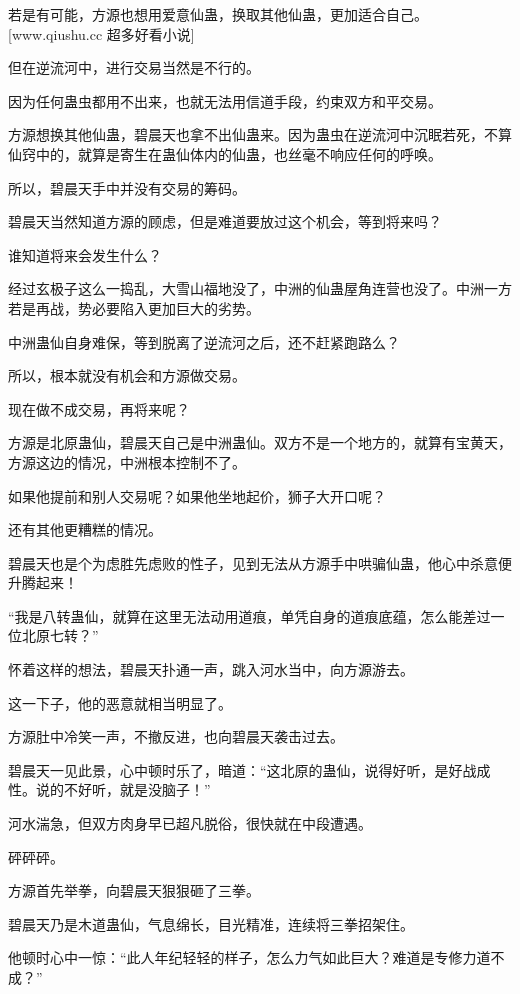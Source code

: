 
\begin{this_body}

若是有可能，方源也想用爱意仙蛊，换取其他仙蛊，更加适合自己。[www.qiushu.cc 超多好看小说]

但在逆流河中，进行交易当然是不行的。

因为任何蛊虫都用不出来，也就无法用信道手段，约束双方和平交易。

方源想换其他仙蛊，碧晨天也拿不出仙蛊来。因为蛊虫在逆流河中沉眠若死，不算仙窍中的，就算是寄生在蛊仙体内的仙蛊，也丝毫不响应任何的呼唤。

所以，碧晨天手中并没有交易的筹码。

碧晨天当然知道方源的顾虑，但是难道要放过这个机会，等到将来吗？

谁知道将来会发生什么？

经过玄极子这么一捣乱，大雪山福地没了，中洲的仙蛊屋角连营也没了。中洲一方若是再战，势必要陷入更加巨大的劣势。

中洲蛊仙自身难保，等到脱离了逆流河之后，还不赶紧跑路么？

所以，根本就没有机会和方源做交易。

现在做不成交易，再将来呢？

方源是北原蛊仙，碧晨天自己是中洲蛊仙。双方不是一个地方的，就算有宝黄天，方源这边的情况，中洲根本控制不了。

如果他提前和别人交易呢？如果他坐地起价，狮子大开口呢？

还有其他更糟糕的情况。

碧晨天也是个为虑胜先虑败的性子，见到无法从方源手中哄骗仙蛊，他心中杀意便升腾起来！

“我是八转蛊仙，就算在这里无法动用道痕，单凭自身的道痕底蕴，怎么能差过一位北原七转？”

怀着这样的想法，碧晨天扑通一声，跳入河水当中，向方源游去。

这一下子，他的恶意就相当明显了。

方源肚中冷笑一声，不撤反进，也向碧晨天袭击过去。

碧晨天一见此景，心中顿时乐了，暗道：“这北原的蛊仙，说得好听，是好战成性。说的不好听，就是没脑子！”

河水湍急，但双方肉身早已超凡脱俗，很快就在中段遭遇。

砰砰砰。

方源首先举拳，向碧晨天狠狠砸了三拳。

碧晨天乃是木道蛊仙，气息绵长，目光精准，连续将三拳招架住。

他顿时心中一惊：“此人年纪轻轻的样子，怎么力气如此巨大？难道是专修力道不成？”


\end{this_body}
